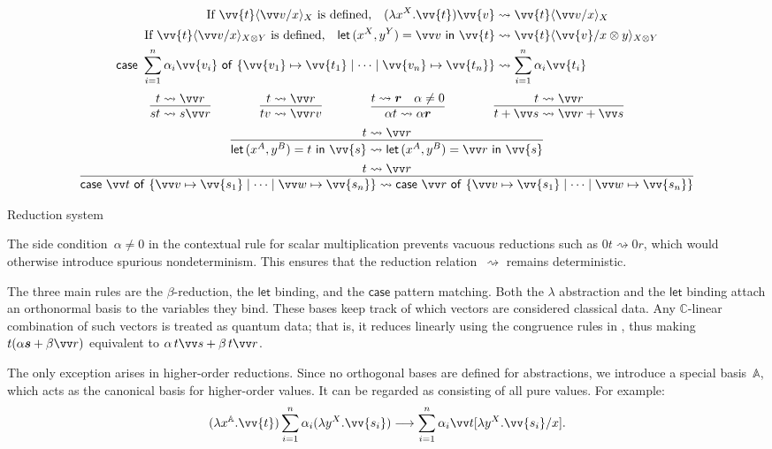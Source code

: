 \documentclass[runningheads,orivec,envcountsame,envcountsect]{llncs}
\newcommand\lra{\longrightarrow}
\newcommand\ansubst[2]{\ensuremath{\langle #1 \rangle_{#2}}}
\newcommand\AbsBasis{\ensuremath{\mathbb{A}}}
\def\C{\mathbb{C}}            %
\def\Pair#1#2{(#1,#2)} %
\def\Lam#1#2#3{\lambda#1^{#2}{.}#3} %
\def\letkeyword{\mathsf{let}}
\def\inkeyword{\mathsf{in}}
\def\LetP#1#2#3#4#5#6{\letkeyword\,\Pair{#1^{#2}}{#3^{#4}}=#5~\inkeyword~#6}
\def\gencase#1#2#3#4#5{\ensuremath{\mathsf{case}~#1~\mathsf{of}~\{#2\mapsto #4 \mid \dotsb \mid #3\mapsto #5\}}}
\def\lraneq{\rightsquigarrow}
\begin{document}
\begin{table}[t]
  \begin{align*}
    \text{If }\vv{t}\ansubst{\vv v/x}{X}\text{ is defined,}\quad
    (\Lam{x}{X}{\vv{t}})\vv{v}
    &\lraneq \vv{t}\ansubst{\vv v/x}{X}\\
    \text{If }\vv{t}\ansubst{\vv v/x}{X\otimes Y}\text{ is defined,}\quad
    \LetP{x}{X}{y}{Y}{\vv v}{\vv{t}}
    &\lraneq \vv{t}\ansubst{\vv{v}/x\otimes y}{X\otimes Y}\\
    \gencase{\sum_{i=1}^{n}\alpha_i \vv{v_i}}{\vv{v_1}}{\vv{v_n}}{\vv{t_1}}{\vv{t_n}}
    &\lraneq \sum_{i=1}^{n}\alpha_i \vv{t_i}
  \end{align*}
  \[
    \begin{array}{c}
      \infer{st\lraneq s\vv r}{t\lraneq \vv r}
      \qquad\qquad
      \infer{tv\lraneq \vv rv}{t\lraneq\vv r}
      \qquad\qquad
      \infer{\alpha t\lraneq \alpha \vec r}{t\lraneq\vec r & \alpha\neq 0}
      \qquad\qquad
      \infer{t+\vv s\lraneq\vv r+\vv s}{t\lraneq\vv r}
      \\[5pt]
      \infer{\LetP{x}{A}{y}{B}{t}{\vv{s}}\lraneq
      \LetP{x}{A}{y}{B}{\vv r}{\vv{s}}}{t\lraneq \vv r} 
      \\[5pt]
      \infer{\gencase{\vv t}{\vv v}{\vv w}{\vv{s_1}}{\vv{s_n}}\lraneq
      \gencase{\vv r}{\vv v}{\vv w}{\vv{s_1}}{\vv{s_n}}}{t\lraneq \vv r}
    \end{array}
  \]
  \caption{Reduction system}
  \label{tab:Reduction}
\end{table}

The side condition~$\alpha\neq0$ in the contextual rule for scalar
multiplication prevents vacuous reductions such as $0t\lraneq 0r$, which would
otherwise introduce spurious nondeterminism. This ensures that the reduction
relation~$\lraneq$ remains deterministic.

The three main rules are the $\beta$-reduction, the $\mathsf{let}$ binding, and
the $\mathsf{case}$ pattern matching. Both the $\lambda$ abstraction and the
$\mathsf{let}$ binding attach an orthonormal basis to the variables they bind.
These bases keep track of which vectors are considered classical data.  Any
$\C$-linear combination of such vectors is treated as quantum data; that is, it
reduces linearly using the congruence rules in
, thus making $t(\alpha\vec
s+\beta\vv r)$ equivalent to $\alpha\,t\vv s+\beta\,t\vv r$.

The only exception arises in higher-order reductions. Since no orthogonal bases
are defined for abstractions, we introduce a special basis~$\AbsBasis$, which
acts as the canonical basis for higher-order values. It can be regarded as consisting
of all pure values. For example:
\[
  (\Lam{x}{\AbsBasis}{\vv{t}})
  \sum_{i=1}^{n}\alpha_i(\Lam{y}{X}{\vv{s_i}})
  \lra
  \sum_{i=1}^n\alpha_i\vv t[\Lam{y}{X}{\vv{s_i}}/x].
\]
\end{document}
